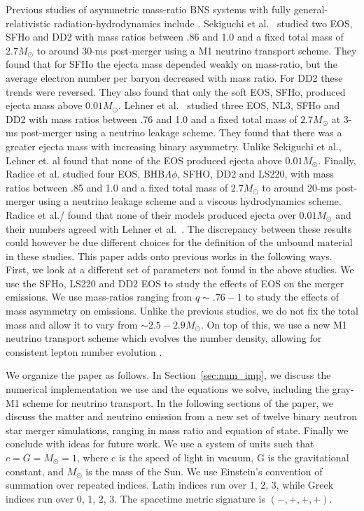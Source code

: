 Previous studies of asymmetric mass-ratio BNS systems with fully general-relativistic radiation-hydrodynamics include
\cite{sekiguchi2016dynamical,lehner2016unequal,radice2018binary}. Sekiguchi et al.~\cite{sekiguchi2016dynamical} studied two EOS, SFHo and DD2 with mass ratios between .86 and 1.0 and a fixed total mass of $2.7M_\odot$ to around 30-ms post-merger using a M1 neutrino transport scheme. They found that for SFHo the ejecta mass depended weakly on mass-ratio, but the average electron number per baryon decreased with mass ratio. For DD2 these trends were reversed. They also found that only the soft EOS, SFHo, produced ejecta mass above $0.01M_\odot$. Lehner et al.~\cite{lehner2016unequal} studied three EOS, NL3, SFHo and DD2 with mass ratios between .76 and 1.0 and a fixed total mass of $2.7M_\odot$ at 3-ms post-merger using a neutrino leakage scheme. They found that there was a greater ejecta mass with increasing binary asymmetry. Unlike Sekiguchi et al., Lehner et. al found that none of the EOS produced ejecta above $0.01M_\odot$. Finally, Radice et al. \cite{radice2018binary} studied four EOS, BHB$\Lambda\phi$, SFHO, DD2 and LS220, with mass ratios between .85 and 1.0 and a fixed total mass of $2.7M_\odot$ to around 20-ms post-merger  using a neutrino leakage scheme and a viscous hydrodynamics scheme. Radice et al./ found that  none of their models produced ejecta over $0.01M_\odot$ and their numbers agreed with Lehner et al.~\cite{lehner2016unequal}. The discrepancy between these results could however be due different choices for the definition of the unbound material in these studies. This paper adds onto previous works in the following ways. First, we look at a different set of parameters not found in the above studies. We use the SFHo, LS220 and DD2 EOS to study the effects of EOS on the merger emissions. We use mass-ratios ranging from $q \sim.76-1$ to study the effects of mass asymmetry on emissions. Unlike the previous studies, we do not fix the total mass and allow it to vary from $\sim 2.5-2.9M_\odot$. On top of this, we use a new M1 neutrino transport scheme which evolves the number density, allowing for consistent lepton number evolution \cite{foucart:2016rxm}. 

We organize the paper as follows. In Section~\ref{sec:num_imp}, we discuss the numerical implementation we use and the
equations we solve, including the gray-M1 scheme for neutrino transport. In the following
sections of the paper, we discuss the matter and neutrino emission from a new set of
twelve binary neutron star merger simulations, ranging in mass ratio and equation of state.
Finally we conclude with ideas for future work. We use a system of units such
that $c = G = M_\odot = 1$, where c is the speed of light in
vacuum, G is the gravitational constant, and $M_\odot$ is the mass
of the Sun. We use Einstein's convention of summation over
repeated indices. Latin indices run over 1, 2, 3, while Greek
indices run over 0, 1, 2, 3. The spacetime metric signature is $(-,+,+,+)$.

